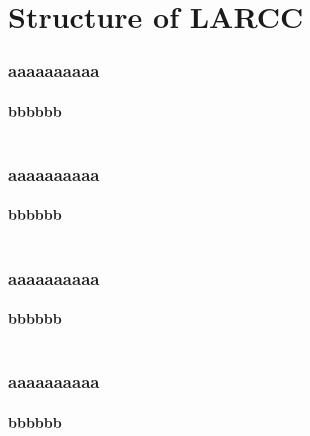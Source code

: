 \documentclass{beamer}
\begin{document}
\section{Structure of LARCC}
\frame
{
  \frametitle{aaaaaaaaaa}
  \framesubtitle{bbbbbb}

\begin{columns}
	\begin{column}{6cm}
	
	\end{column}
\pause
	\begin{column}{6cm}
	
	\end{column}
\end{columns}

}
\frame
{
  \frametitle{aaaaaaaaaa}
  \framesubtitle{bbbbbb}

\begin{columns}
	\begin{column}{6cm}
	
	\end{column}
\pause
	\begin{column}{6cm}
	
	\end{column}
\end{columns}

}
\frame
{
  \frametitle{aaaaaaaaaa}
  \framesubtitle{bbbbbb}

\begin{columns}
	\begin{column}{6cm}
	
	\end{column}
\pause
	\begin{column}{6cm}
	
	\end{column}
\end{columns}

}
\frame
{
  \frametitle{aaaaaaaaaa}
  \framesubtitle{bbbbbb}

\begin{columns}
	\begin{column}{6cm}
	
	\end{column}
\pause
	\begin{column}{6cm}
	
	\end{column}
\end{columns}

}
\end{document}
